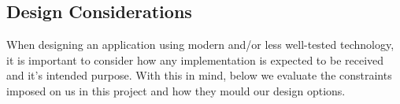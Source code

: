 \subsection{Design Considerations}

When designing an application using modern and/or less well-tested technology, it is important to consider how any implementation is expected to be received and it's intended purpose. With this in mind, below we evaluate the constraints imposed on us in this project and how they mould our design options.
